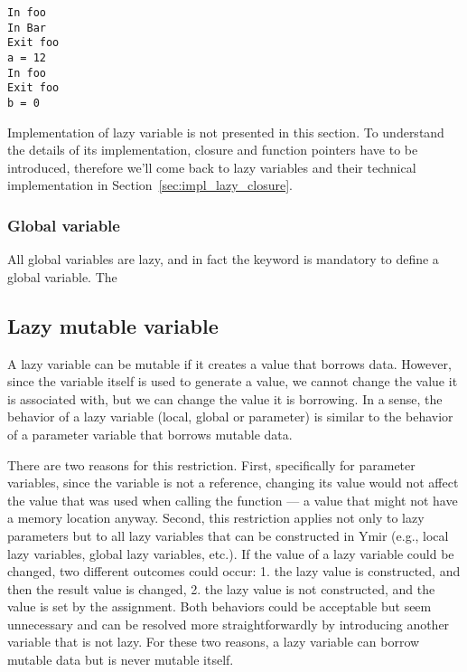 \begin{lstlisting}[style=bashVerb, caption=Result of execution of Listing~\ref{lst:(chap6):accept_laziness}, label=lst:(chap6):result_accept_laziness]
In foo
In Bar
Exit foo
a = 12
In foo
Exit foo
b = 0
\end{lstlisting}

Implementation of lazy variable is not presented in this section. To understand
the details of its implementation, closure and function pointers have to be
introduced, therefore we'll come back to lazy variables and their technical
implementation in Section~\ref{sec:impl_lazy_closure}.

\subsubsection*{Global variable}

All global variables are lazy, and in fact the keyword  is mandatory
to define a global variable. The

\subsection {Lazy mutable variable}
\label{sec:variable_lazy_mut}

A lazy variable can be mutable if it creates a value that borrows data. However,
since the variable itself is used to generate a value, we cannot change the
value it is associated with, but we can change the value it is borrowing. In a
sense, the behavior of a lazy variable (local, global or parameter) is similar
to the behavior of a parameter variable that borrows mutable data.

There are two reasons for this restriction. First, specifically for parameter
variables, since the variable is not a reference, changing its value would not
affect the value that was used when calling the function — a value that might
not have a memory location anyway. Second, this restriction applies not only to
lazy parameters but to all lazy variables that can be constructed in Ymir (e.g.,
local lazy variables, global lazy variables, etc.). If the value of a lazy
variable could be changed, two different outcomes could occur: 1. the lazy value
is constructed, and then the result value is changed, 2. the lazy value is not
constructed, and the value is set by the assignment. Both behaviors could be
acceptable but seem unnecessary and can be resolved more straightforwardly by
introducing another variable that is not lazy. For these two reasons, a lazy
variable can borrow mutable data but is never mutable itself.

